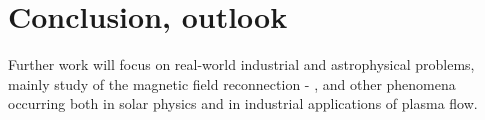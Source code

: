\chapter*{Conclusion, outlook}
Further work will focus on real-world industrial and astrophysical problems, mainly study of the magnetic field reconnection - \cite{reconnection}, and other phenomena occurring both in solar physics and in industrial applications of plasma flow.